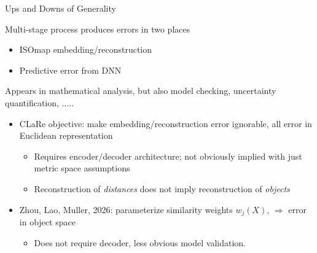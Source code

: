 \documentclass[compress]{beamer}
\newcommand{\Frechet}{Fr\'echet}
\newcommand{\Xbold}{\bm{X}}
\begin{document}
\begin{frame}{Ups and Downs of Generality}


Multi-stage process produces errors in two places
\begin{itemize}
\item ISOmap embedding/reconstruction

\item Predictive error from DNN 
\end{itemize}
Appears in mathematical analysis, but also model checking, uncertainty quantification, $\ldots$.. 

\vspace{0.2cm}

\begin{itemize}
\item CLaRe objective:  make embedding/reconstruction error ignorable, all error in Euclidean representation
\begin{itemize}
\item Requires encoder/decoder architecture; not obviously implied with just metric space assumptions

\item Reconstruction of {\em distances} does not imply reconstruction of {\em objects}
\end{itemize}

\item Zhou, Lao,  Muller, 2026: parameterize similarity weights $w_j(X)$, $\Rightarrow$ error in object space
\begin{itemize}
\item Does not require decoder, less obvious model validation. 
\end{itemize}
\end{itemize}



%
%

\end{frame}
\end{document}
